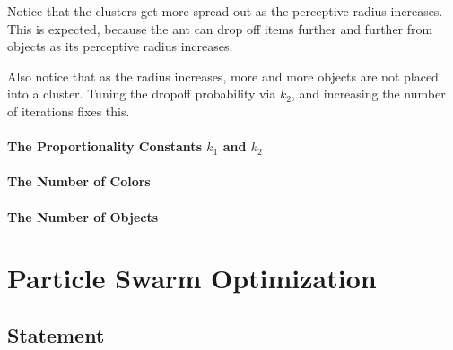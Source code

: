 \documentclass[12pt]{article}
\begin{document}
Notice that the clusters get more spread out as the perceptive radius increases.
This is expected, because the ant can drop off items further and further from objects as its perceptive radius increases.

Also notice that as the radius increases, more and more objects are not placed into a cluster. Tuning the dropoff probability via $k_2$, and increasing the number of iterations fixes this.

\paragraph{The Proportionality Constants $k_1$ and $k_2$}
\paragraph{The Number of Colors}
\paragraph{The Number of Objects}

\section{Particle Swarm Optimization}

\subsection{Statement}
\end{document}
